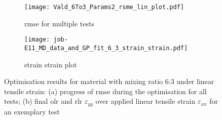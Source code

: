 \begin{figure}[H]
\centering
\begin{subfigure}[t]{0.495\textwidth}
    \centering
    \texttt{[image: Vald\_6To3\_Params2\_rsme\_lin\_plot.pdf]}
    \caption{rmse for multiple tests}
    \label{fig:verifRMSEProgress}
\end{subfigure}
\hfill
\begin{subfigure}[t]{0.495\textwidth}
    \centering
    \centering
    \texttt{[image: job-E11\_MD\_data\_and\_GP\_fit\_6\_3\_strain\_strain.pdf]}
    \caption{strain strain plot}
    \label{fig:verfiStrainStrain}
\end{subfigure}
\caption{Optimisation results for material with mixing ratio 6:3 under linear tensile strain: (a) progress of \acrfull{rmse} during the optimisation for all tests; (b) final \acrlong{olr} and \acrfull{rlr} $\varepsilon_{yy}$ over applied linear tensile strain $\varepsilon_{xx}$ for an exemplary test}
\label{fig:voceAndRMSEVerif}
\end{figure}

